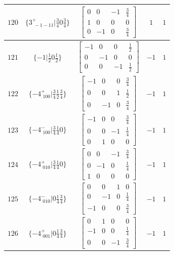 \documentclass[fleqn,8pt]{jsarticle}
\begin{document}
\begin{longtable}{ccccc}
$ 120 $ & $ \{3^{+}_{\,\,-1-11}|\frac{3}{4} 0 \frac{3}{4}\} $ & $ \begin{bmatrix} 0 & 0 & -1 & \frac{3}{4} \\ 1 & 0 & 0 & 0 \\ 0 & -1 & 0 & \frac{3}{4} \end{bmatrix} $ & $ 1 $ & $ 1 $ \\ \hline
$ 121 $ & $ \{-1|\frac{1}{2} 0 \frac{1}{2}\} $ & $ \begin{bmatrix} -1 & 0 & 0 & \frac{1}{2} \\ 0 & -1 & 0 & 0 \\ 0 & 0 & -1 & \frac{1}{2} \end{bmatrix} $ & $ -1 $ & $ 1 $ \\ \hline
$ 122 $ & $ \{-4^{+}_{\,\,100}|\frac{3}{4} \frac{1}{2} \frac{3}{4}\} $ & $ \begin{bmatrix} -1 & 0 & 0 & \frac{3}{4} \\ 0 & 0 & 1 & \frac{1}{2} \\ 0 & -1 & 0 & \frac{3}{4} \end{bmatrix} $ & $ -1 $ & $ 1 $ \\ \hline
$ 123 $ & $ \{-4^{-}_{\,\,100}|\frac{3}{4} \frac{1}{4} 0\} $ & $ \begin{bmatrix} -1 & 0 & 0 & \frac{3}{4} \\ 0 & 0 & -1 & \frac{1}{4} \\ 0 & 1 & 0 & 0 \end{bmatrix} $ & $ -1 $ & $ 1 $ \\ \hline
$ 124 $ & $ \{-4^{+}_{\,\,010}|\frac{3}{4} \frac{1}{4} 0\} $ & $ \begin{bmatrix} 0 & 0 & -1 & \frac{3}{4} \\ 0 & -1 & 0 & \frac{1}{4} \\ 1 & 0 & 0 & 0 \end{bmatrix} $ & $ -1 $ & $ 1 $ \\ \hline
$ 125 $ & $ \{-4^{-}_{\,\,010}|0 \frac{1}{4} \frac{3}{4}\} $ & $ \begin{bmatrix} 0 & 0 & 1 & 0 \\ 0 & -1 & 0 & \frac{1}{4} \\ -1 & 0 & 0 & \frac{3}{4} \end{bmatrix} $ & $ -1 $ & $ 1 $ \\ \hline
$ 126 $ & $ \{-4^{+}_{\,\,001}|0 \frac{1}{4} \frac{3}{4}\} $ & $ \begin{bmatrix} 0 & 1 & 0 & 0 \\ -1 & 0 & 0 & \frac{1}{4} \\ 0 & 0 & -1 & \frac{3}{4} \end{bmatrix} $ & $ -1 $ & $ 1 $ \\ \hline

\end{longtable}
\end{document}
